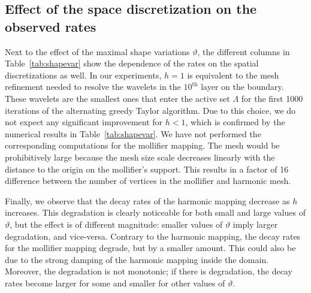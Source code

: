 \subsection{Effect of the space discretization on the observed rates}
\label{subsec:convstudy}
Next to the effect of the maximal shape variations $\vartheta$, the different columns in Table~\ref{tab:shapevar} show the dependence of the rates on the spatial discretizations as well.
In our experiments, $h=1$ is equivalent to the mesh refinement needed to resolve the wavelets in the $10^{\text{th}}$ layer on the boundary.
These wavelets are the smallest ones that enter the active set $\Lambda$ for the first 1000 iterations of the alternating greedy Taylor algorithm.
Due to this choice, we do not expect any significant improvement for $h < 1$, which is confirmed by the numerical results in Table~\ref{tab:shapevar}.
We have not performed the corresponding computations for the mollifier mapping.
The mesh would be prohibitively large because the mesh size scale decreases linearly with the distance to the origin on the mollifier's support.
This results in a factor of 16 difference between the number of vertices in the mollifier and harmonic mesh.

Finally, we observe that the decay rates of the harmonic mapping decrease as $h$ increases.
This degradation is clearly noticeable for both small and large values of $\vartheta$, but the effect is of different magnitude: smaller values of $\vartheta$ imply larger degradation, and vice-versa.
Contrary to the harmonic mapping, the decay rates for the mollifier mapping degrade, but by a smaller amount.
This could also be due to the strong damping of the harmonic mapping inside the domain.
Moreover, the degradation is not monotonic; if there is degradation, the decay rates become larger for some and smaller for other values of $\vartheta$.
